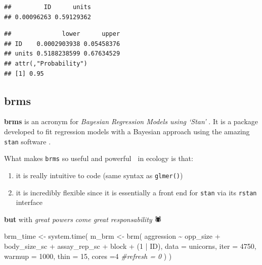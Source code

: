\documentclass[
  12pt,
]{book}
\newenvironment{Shaded}{\begin{snugshade}}{\end{snugshade}}
\newcommand{\AttributeTok}[1]{\textcolor[rgb]{0.77,0.63,0.00}{#1}}
\newcommand{\CommentTok}[1]{\textcolor[rgb]{0.56,0.35,0.01}{\textit{#1}}}
\newcommand{\DecValTok}[1]{\textcolor[rgb]{0.00,0.00,0.81}{#1}}
\newcommand{\FunctionTok}[1]{\textcolor[rgb]{0.00,0.00,0.00}{#1}}
\newcommand{\NormalTok}[1]{#1}
\newcommand{\OtherTok}[1]{\textcolor[rgb]{0.56,0.35,0.01}{#1}}
\newcommand{\SpecialCharTok}[1]{\textcolor[rgb]{0.00,0.00,0.00}{#1}}
\providecommand{\tightlist}{%
  \setlength{\itemsep}{0pt}\setlength{\parskip}{0pt}}
\begin{document}
\begin{verbatim}
##         ID      units 
## 0.00096263 0.59129362
\end{verbatim}

\begin{Shaded}
\end{Shaded}

\begin{verbatim}
##              lower      upper
## ID    0.0002903938 0.05458376
## units 0.5188238599 0.67634529
## attr(,"Probability")
## [1] 0.95
\end{verbatim}

\hypertarget{brms}{%
\subsection{brms}\label{brms}}

\textbf{brms} is an acronym for \emph{Bayesian Regression Models using `Stan'} \citep{R-brms}. It is a package developed to fit regression models with a Bayesian approach using the amazing \texttt{stan} software \citep{stan2021}.

What makes \texttt{brms} so useful and powerful 💪 in ecology is that:

\begin{enumerate}
\def\labelenumi{\arabic{enumi}.}
\tightlist
\item
  it is really intuitive to code (same syntax as \texttt{glmer()})
\item
  it is incredibly flexible since it is essentially a front end for \texttt{stan} via its \texttt{rstan} interface \citep{R-rstan}
\end{enumerate}

\textbf{but} with \emph{great powers come great responsability} 🕷

\begin{Shaded}
\begin{Highlighting}[]
\NormalTok{brm\_time }\OtherTok{\textless{}{-}} \FunctionTok{system.time}\NormalTok{(}
\NormalTok{  m\_brm }\OtherTok{\textless{}{-}} \FunctionTok{brm}\NormalTok{(}
\NormalTok{    aggression }\SpecialCharTok{\textasciitilde{}}\NormalTok{ opp\_size }\SpecialCharTok{+}\NormalTok{ body\_size\_sc }\SpecialCharTok{+}\NormalTok{ assay\_rep\_sc }\SpecialCharTok{+}\NormalTok{ block}
        \SpecialCharTok{+}\NormalTok{ (}\DecValTok{1} \SpecialCharTok{|}\NormalTok{ ID),}
    \AttributeTok{data =}\NormalTok{ unicorns, }\AttributeTok{iter =} \DecValTok{4750}\NormalTok{, }\AttributeTok{warmup =} \DecValTok{1000}\NormalTok{, }\AttributeTok{thin =} \DecValTok{15}\NormalTok{, }\AttributeTok{cores =}\DecValTok{4}
    \CommentTok{\#refresh = 0}
\NormalTok{  )}
\NormalTok{)}
\end{Highlighting}
\end{Shaded}
\end{document}
